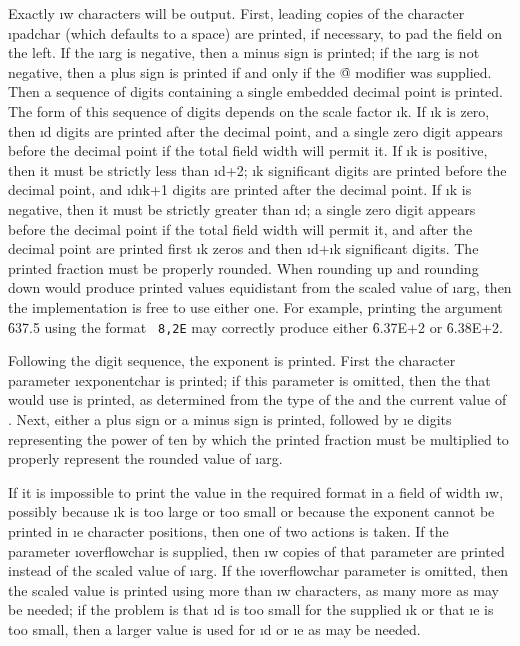 Exactly \i{w} characters will
be output.  First, leading copies of the character \i{padchar}
(which defaults to a space) are printed, if necessary, to pad the
field on the left.
If the \i{arg} is negative, then a minus sign is printed;
if the \i{arg} is not negative, then a plus sign is printed
if and only if the \f{@}
modifier was supplied.  Then a sequence
of digits containing a single embedded decimal point is printed.
The form of this sequence of digits depends on the scale factor \i{k}.
If \i{k} is zero, then \i{d} digits are printed after the decimal
point, and a single zero digit appears before the decimal point if
the total field width will permit it.  If \i{k} is positive,
then it must be strictly less than \i{d}+2;  \i{k} significant digits
are printed before the decimal point, and \i{d}\minussign \i{k}+1
digits are printed after the decimal point.  If \i{k} is negative,
then it must be strictly greater than \minussign \i{d};
a single zero digit appears before the decimal point if
the total field width will permit it, and after the decimal point
are printed first
\minussign \i{k} zeros and then \i{d}+\i{k} significant digits.
The printed fraction must be properly rounded.         
When rounding up and rounding down would produce printed values
equidistant from the scaled value of \i{arg}, then the implementation
is free to use either one.  For example, printing the argument
\f{637.5} using the format {\tt ~8,2E} may correctly produce
either \f{6.37E+2} or \f{6.38E+2}.

Following the digit sequence, the exponent is printed.
First the character parameter \i{exponentchar} is printed; if this
parameter is omitted, then the  that
 would use is printed, as determined from the
type of the  and the current value of
.
Next, either a plus sign or a minus sign
is printed, followed by \i{e} digits representing the power of
ten by which the printed fraction must be multiplied
to properly represent the rounded value of \i{arg}.

If it is impossible to print the value in the required format in a field
of width \i{w}, possibly because \i{k} is too large or too small
or because the exponent cannot be printed in \i{e} character positions,
then one of two actions is taken.  If the
parameter \i{overflowchar} is supplied, then \i{w} copies of that
parameter are printed instead of the scaled value of \i{arg}.
If the \i{overflowchar} parameter is omitted, then the scaled value
is printed using more than \i{w} characters, as many more as may be
needed; if the problem is that \i{d} is too small for the supplied \i{k}
or that \i{e} is too small, then a larger value is used for \i{d} or \i{e}
as may be needed.

